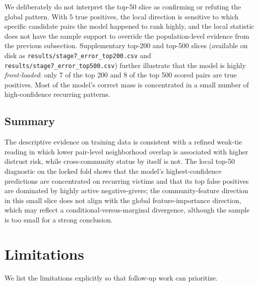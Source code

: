 \documentclass[conference]{IEEEtran}
\newcommand{\code}[1]{\texttt{#1}}
\begin{document}
We deliberately do not interpret the top-50 slice as confirming or
refuting the global pattern. With 5 true positives, the local
direction is sensitive to which specific candidate pairs the model
happened to rank highly, and the local statistic does not have the
sample support to override the population-level evidence from the
previous subsection. Supplementary top-200 and top-500 slices
(available on disk as \code{results/stage7\_error\_top200.csv} and
\code{results/stage7\_error\_top500.csv}) further illustrate that
the model is highly \emph{front-loaded}: only 7 of the top 200 and
8 of the top 500 scored pairs are true positives. Most of the model's
correct mass is concentrated in a small number of high-confidence
recurring patterns.

\subsection{Summary}

The descriptive evidence on training data is consistent with a
refined weak-tie reading in which lower pair-level neighborhood
overlap is associated with higher distrust risk, while cross-community
status by itself is not. The local top-50 diagnostic on the locked
fold shows that the model's highest-confidence predictions are
concentrated on recurring victims and that its top false positives
are dominated by highly active negative-givers; the community-feature
direction in this small slice does not align with the global
feature-importance direction, which may reflect a conditional-versus-marginal
divergence, although the sample is too small for a strong conclusion.

\section{Limitations}\label{sec:lim}

We list the limitations explicitly so that follow-up work can
prioritize.
\end{document}
